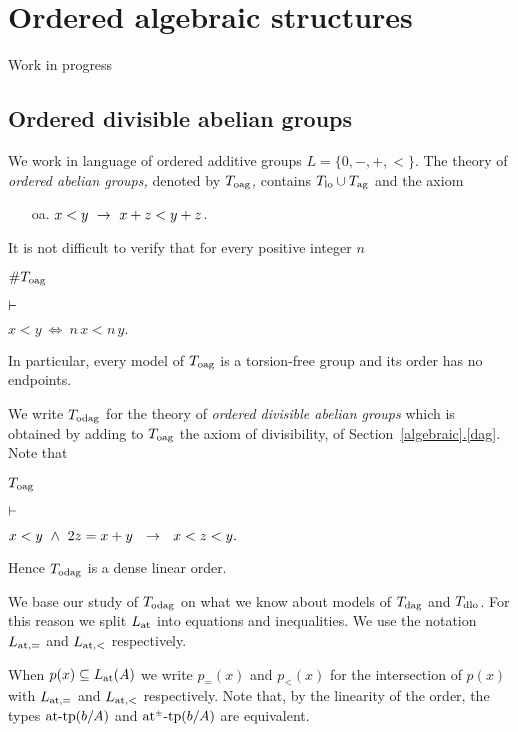 \chapter{Ordered algebraic structures}
\label{oalgebraic}


Work in progress

\section{Ordered divisible abelian groups}

\def\medrel#1{\parbox{5ex}{\hfil$\displaystyle #1$}}
\def\ceq#1#2#3{\parbox{20ex}{$\displaystyle #1$}\medrel{#2}$\displaystyle  #3$}

We work in language of ordered additive groups $L=\{0,-,+, <\}$.
%
The theory of \emph{ordered abelian groups,} denoted by \emph{$T_{\rm oag}$,} contains $T_{\rm lo}\cup T_{\rm ag}$ and the axiom

\begin{itemize}
  \item[oa.] $x<y\ \rightarrow\ x+z<y+z$.
\end{itemize}

It is not difficult to verify that for every positive integer $n$

\ceq{\#\hfill T_{\rm oag}}{\proves}{x < y \ \iff\ n\,x<n\,y.}

In particular, every model of $T_{\rm oag}$ is a torsion-free group and its order has no endpoints.

We write \emph{$T_{\rm odag}$\/} for the theory of \emph{ordered divisible abelian groups\/} which is obtained by adding to $T_{\rm oag}$ the axiom of divisibility,  of Section~\hyperref[dag]{\ref*{algebraic}.\ref*{dag}}.
%
Note that

\ceq{\hfill T_{\rm oag}}{\proves}{x < y\ \wedge\ 2z=x+y\ \ \imp\ \ x<z<y.}

Hence $T_{\rm odag}$ is a dense linear order.


We base our study of $T_{\rm odag}$ on what we know about models of $T_{\rm dag}$ and $T_{\rm dlo}$.
%
For this reason we split $L_{\rm at}$ into equations and inequalities.
%
We use the notation \emph{$L_{\rm at,=}$\/} and \emph{$L_{\rm at,<}$\/} respectively.

When $p(x)\subseteq L_{\rm at}(A)$ we write $p_{=}(x)$ and $p_{<}(x)$ for the intersection of $p(x)$ with $L_{\rm at,=}$ and $L_{\rm at,<}$ respectively.
Note that, by the linearity of the order, the types ${\rm at\mbox{-}tp}(b/A)$ and $\mbox{\rm at$^{\scriptscriptstyle\pm}$-tp}(b/A)$ are equivalent.


